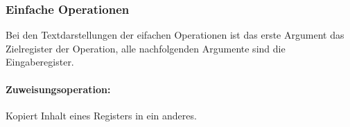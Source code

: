 \documentclass[twoside,a4paper,fleqn,12pt]{book}
\begin{document}
\newpage
\subsubsection{Einfache Operationen}

Bei den Textdarstellungen der eifachen Operationen ist das erste Argument das Zielregister der Operation, alle nachfolgenden
Argumente sind die Eingaberegister.

\newcommand\SeqOpSample[2]{
  \renewcommand{\baselinestretch}{1.0}\normalsize
  \emph{Beispiel und Zwischencode:}\\
  \makebox[\textwidth]{
    \centering
    \begin{minipage}{7cm}\end{minipage}
    \begin{minipage}{8cm}\end{minipage}
    \label{fig:ir_example_#1}
  }
  \renewcommand{\baselinestretch}{1.50}\normalsize
}
\newcommand\SeqOpSampleStackedSeparate[3]{
  \vspace*{1em}
  \emph{Beispiel und Zwischencode:}
  \vspace*{-1em}
  \renewcommand{\baselinestretch}{1.0}\normalsize
    \begin{center}
    \begin{minipage}{7cm}\end{minipage}
    \begin{minipage}{\textwidth}\end{minipage}
    \label{fig:ir_example_#1}
    \end{center}
    \vspace*{-1em}
  \renewcommand{\baselinestretch}{1.50}\normalsize
}
\newcommand\SeqOpSampleStacked[2]{\SeqOpSampleStackedSeparate{#1}{#1}{#2}}

\paragraph{Zuweisungsoperation:} Kopiert Inhalt eines Registers in ein anderes.
\end{document}
